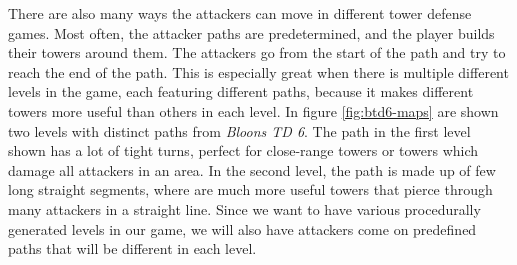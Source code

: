 There are also many ways the attackers can move in different tower defense games.
Most often, the attacker paths are predetermined, and the player builds their towers around them.
The attackers go from the start of the path and try to reach the end of the path.
This is especially great when there is multiple different levels in the game, each featuring different paths, because it makes different towers more useful than others in each level.
In figure \ref{fig:btd6-maps} are shown two levels with distinct paths from \emph{Bloons TD 6}.
The path in the first level shown has a lot of tight turns, perfect for close-range towers or towers which damage all attackers in an area.
In the second level, the path is made up of few long straight segments, where are much more useful towers that pierce through many attackers in a straight line.
Since we want to have various procedurally generated levels in our game, we will also have attackers come on predefined paths that will be different in each level.

